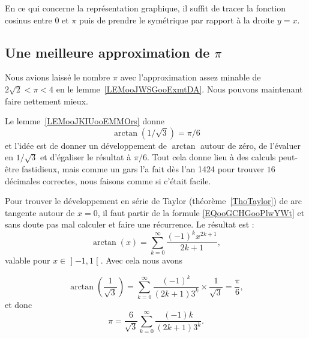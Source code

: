 	En ce qui concerne la représentation graphique, il suffit de tracer la fonction cosinus entre \( 0\) et \( \pi\) puis de prendre le symétrique par rapport à la droite \( y=x\).

	\begin{center}
		
	\end{center}

	\subsection{Une meilleure approximation de \( \pi\)}

	Nous avions laissé le nombre \( \pi\) avec l'approximation assez minable de \( 2\sqrt{ 2 }<\pi<4\) en le lemme~\ref{LEMooJWSGooExmtDA}. Nous pouvons maintenant faire nettement mieux.

	Le lemme~\ref{LEMooJKIUooEMMOrs} donne
	\begin{equation}
		\arctan(1/\sqrt{ 3 })=\pi/6
	\end{equation}
	et l'idée est de donner un développement de \( \arctan\) autour de zéro, de l'évaluer en \( 1/\sqrt{ 3 }\) et d'égaliser le résultat à \( \pi/6\). Tout cela donne lieu à des calculs peut-être fastidieux, mais comme un gars l'a fait dès l'an 1424\cite{ooOMUNooGROVUu} pour trouver \( 16\) décimales correctes, nous faisons comme si c'était facile.

	Pour trouver le développement en série de Taylor (théorème~\ref{ThoTaylor}) de arc tangente autour de \( x=0\), il faut partir de la formule \eqref{EQooGCHGooPlwYWt} et sans doute pas mal calculer et faire une récurrence. Le résultat est :
	\begin{equation}
		\arctan(x)=\sum_{k=0}^{\infty}\frac{ (-1)^{k}x^{2k+1} }{ 2k+1 },
	\end{equation}
	valable pour \( x\in \mathopen] -1 , 1 \mathclose[\). Avec cela nous avons

\begin{equation}
	\arctan(\frac{1}{ \sqrt{ 3 } })=\sum_{k=0}^{\infty}\frac{ (-1)^k }{ (2k+1)3^k }\times \frac{1}{ \sqrt{ 3 } }=\frac{ \pi }{ 6 },
\end{equation}
et donc
\begin{equation}
	\pi=\frac{ 6 }{ \sqrt{ 3 } }\sum_{k=0}^{\infty}\frac{ (-1)k }{ (2k+1)3^k }.
\end{equation}

